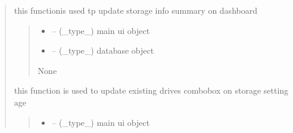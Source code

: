 \documentclass[letterpaper,10pt,english]{sphinxmanual}
\begin{document}
\begin{quote}

\begin{savenotes}\begin{fulllineitems}
\label{\detokenize{setting/backend/storage_funcs:oxin.backend.storage_funcs.show_storage_status}}
\pysigstartsignatures
{}
\pysigstopsignatures
\sphinxAtStartPar
this functionis used tp update storage info summary on dashboard
\begin{quote}\begin{description}
\begin{itemize}
\item {} 
\sphinxAtStartPar
{} – (\_type\_) main ui object

\item {} 
\sphinxAtStartPar
{} – (\_type\_) database object

\end{itemize}

\sphinxAtStartPar
None

\end{description}\end{quote}

\end{fulllineitems}\end{savenotes}


\begin{savenotes}\begin{fulllineitems}
\label{\detokenize{setting/backend/storage_funcs:oxin.backend.storage_funcs.update_camera_live_drive_combo}}
\pysigstartsignatures
{}
\pysigstopsignatures
\sphinxAtStartPar
this function is used to update existing drives combobox on storage setting age
\begin{quote}\begin{description}
\begin{itemize}
\item {} 
\sphinxAtStartPar
{} – (\_type\_) main ui object


\end{itemize}
\end{description}
\end{quote}
\end{fulllineitems}
\end{savenotes}
\end{quote}
\end{document}
